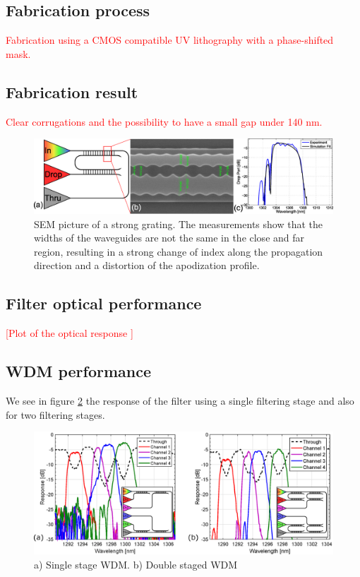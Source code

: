 \documentclass[letterpaper,10pt]{article}
\newcommand\todo[1]{\textcolor{red}{#1}}
\begin{document}
\subsection{Fabrication process}
\todo{Fabrication using a CMOS compatible UV lithography with a phase-shifted mask.}

\subsection{Fabrication result}
\todo{Clear corrugations and the possibility to have a small gap under 140 nm.}
\begin{figure}[htbp]
	\centering
	\includegraphics[width=.99\columnwidth]{SingleFilterFig}
	\caption{SEM picture of a strong grating. The measurements show that the widths of the waveguides are not the same in the close and far region, resulting in a strong change of index along the propagation direction and a distortion of the apodization profile. }
	\label{fig:litho}
\end{figure}

\subsection{Filter optical performance}
\todo{[Plot of the optical response ]}

\subsection{WDM performance}
We see in figure \ref{fig:WDM} the response of the filter using a single filtering stage and also for two filtering stages.
\begin{figure}[htbp]
	\centering
	\includegraphics[width=.99\columnwidth]{WDM}
	\caption{a) Single stage WDM. b) Double staged WDM }
	\label{fig:WDM}
\end{figure}
\end{document}
